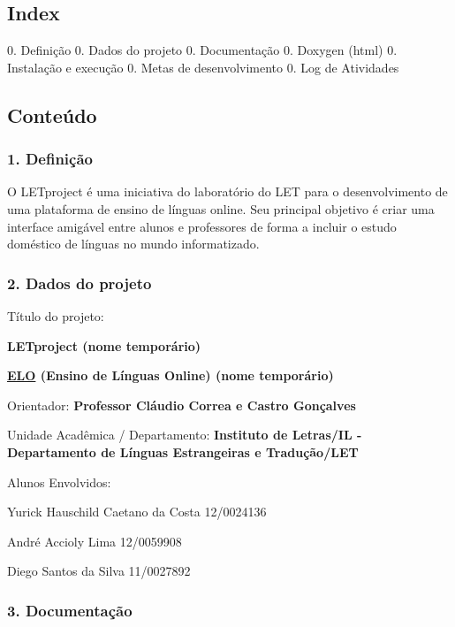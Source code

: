 \subsection*{Index}

0. Definição 0. Dados do projeto 0. Documentação 0. Doxygen (html) 0. Instalação e execução 0. Metas de desenvolvimento 0. Log de Atividades

\subsection*{Conteúdo}

\subsubsection*{1. Definição}

O L\-E\-Tproject é uma iniciativa do laboratório do L\-E\-T para o desenvolvimento de uma plataforma de ensino de línguas online. Seu principal objetivo é criar uma interface amigável entre alunos e professores de forma a incluir o estudo doméstico de línguas no mundo informatizado.

\subsubsection*{2. Dados do projeto}

Título do projeto\-:
\begin{DoxyItemize}
\item {\bfseries L\-E\-Tproject (nome temporário)}
\item {\bfseries \hyperlink{namespaceELO}{E\-L\-O} (Ensino de Línguas Online) (nome temporário)}
\end{DoxyItemize}

Orientador\-: {\bfseries Professor Cláudio Correa e Castro Gonçalves}

Unidade Acadêmica / Departamento\-: {\bfseries Instituto de Letras/\-I\-L -\/ Departamento de Línguas Estrangeiras e Tradução/\-L\-E\-T}

Alunos Envolvidos\-:
\begin{DoxyItemize}
\item Yurick Hauschild Caetano da Costa 12/0024136
\item André Accioly Lima 12/0059908
\item Diego Santos da Silva 11/0027892
\end{DoxyItemize}

\subsubsection*{3. Documentação}

